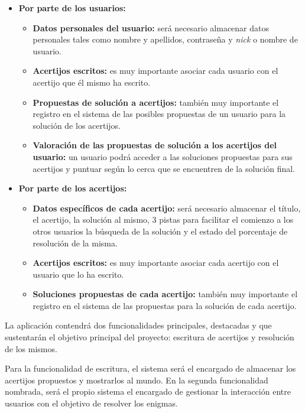 \begin{itemize}
    \item \textbf{Por parte de los usuarios:}
    \begin{itemize}
        \item \textbf{Datos personales del usuario:} será necesario almacenar datos personales tales como nombre y apellidos, contraseña y \textit{nick} o nombre de usuario.
        \item \textbf{Acertijos escritos:} es muy importante asociar cada usuario con el acertijo que él mismo ha escrito.
        \item \textbf{Propuestas de solución a acertijos:} también muy importante el registro en el sistema de las posibles propuestas de un usuario para la solución de los acertijos.
        \item \textbf{Valoración de las propuestas de solución a los acertijos del usuario:} un usuario podrá acceder a las soluciones propuestas para sus acertijos y puntuar según lo cerca que se encuentren de la solución final.
    \end{itemize}
    \item \textbf{Por parte de los acertijos:}
    \begin{itemize}
        \item \textbf{Datos específicos de cada acertijo:} será necesario almacenar el título, el acertijo, la solución al mismo, 3 pistas para facilitar el comienzo a los otros usuarios la búsqueda de la solución y el estado del porcentaje de resolución de la misma.
        \item \textbf{Acertijos escritos:} es muy importante asociar cada acertijo con el usuario que lo ha escrito.
        \item \textbf{Soluciones propuestas de cada acertijo:} también muy importante el registro en el sistema de las propuestas para la solución de cada acertijo.
    \end{itemize}
\end{itemize}

La aplicación contendrá dos funcionalidades principales, destacadas y que sustentarán el objetivo principal del proyecto: escritura de acertijos y resolución de los mismos.

Para la funcionalidad de escritura, el sistema será el encargado de almacenar los acertijos propuestos y mostrarlos al mundo. En la segunda funcionalidad nombrada, será el propio sistema el encargado de gestionar la interacción entre usuarios con el objetivo de resolver los enigmas.

